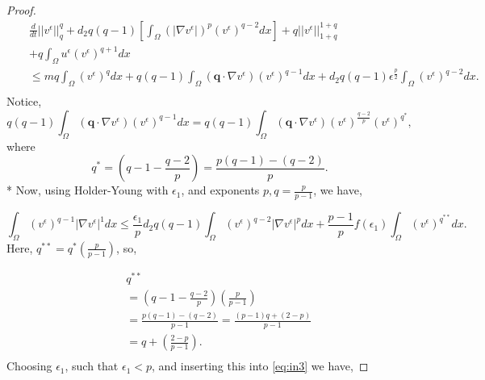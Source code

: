 \documentclass[10pt,a4paper]{amsart}
\begin{document}
\begin{proof}
\begin{eqnarray}
\label{eq:in3}
&& \frac{d}{dt}||v^{\epsilon}||^{q}_{q}  + d_{2}  q(q-1)[\int_{\Omega} \left(
|\nabla v^{\epsilon}|\right)^{p}(v^{\epsilon})^{q-2} dx ]
+q||v^{\epsilon}||^{1+q}_{1+q} \nonumber \\
&& + q\int_{\Omega}  u^{\epsilon}(v^{\epsilon})^{q+1}dx 
 \nonumber \\
&& 
\leq mq\int_{\Omega} (v^{\epsilon})^{q}dx + q(q-1)\int_{\Omega} (\textbf{q}\cdot \nabla v^{\epsilon}) (v^{\epsilon})^{q-1}dx + d_{2}  q(q-1) \epsilon^{\frac{p}{2}}\int_{\Omega} (v^{\epsilon})^{q-2} dx.
\nonumber \\
\end{eqnarray}
%
Notice,
\begin{equation}
q(q-1)\int_{\Omega} (\textbf{q}\cdot \nabla v^{\epsilon}) (v^{\epsilon})^{q-1}dx = q(q-1)\int_{\Omega} (\textbf{q}\cdot \nabla v^{\epsilon}) (v^{\epsilon})^{\frac{q-2}{p}} (v^{\epsilon})^{q^{*}} ,
\end{equation}
where 
%
\begin{equation}
    q^{*} = \left(q-1 - \frac{q-2}{p}\right)= \frac{p(q-1) -(q-2)}{p}.
\end{equation}
*
Now, using Holder-Young with $\epsilon_{1}$, and exponents $p, q=\frac{p}{p-1}$, we have,

\begin{equation}
\int_{\Omega} (v^{\epsilon})^{q-1}|\nabla v^{\epsilon}|^{1}dx
\leq \frac{\epsilon_{1}}{p} d_{2} q(q-1)\int_{\Omega} (v^{\epsilon})^{q-2}|\nabla v^{\epsilon}|^{p}dx + \frac{p-1}{p}f(\epsilon_{1})\int_{\Omega} (v^{\epsilon})^{q^{**}}dx.
\end{equation}
%
Here, $q^{**} = q^{*}\left(\frac{p}{p-1}\right)$, so,


\begin{eqnarray}
   && q^{**} \nonumber \\
   && = \left(q-1 - \frac{q-2}{p}\right)\left( \frac{p}{p-1}\right)  \nonumber \\
   && = \frac{p(q-1) -(q-2)}{p-1} = \frac{(p-1)q + (2-p)}{p-1}  \nonumber \\
   && = q + \left(\frac{2-p}{p-1}\right).  \nonumber \\
\end{eqnarray}
%
Choosing $\epsilon_{1}$, such that $\epsilon_{1} < p $, and inserting this into \eqref{eq:in3} we have,



\end{proof}
\end{document}
